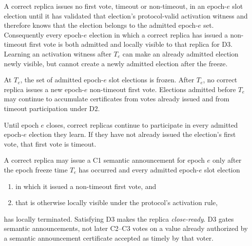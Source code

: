 \documentclass[11pt]{article}
\theoremstyle{definition}
\theoremstyle{remark}
\begin{document}
\begin{description}[leftmargin=2.4em,labelindent=0em]
\item[D0 (admission-gated epoch voting).]
A correct replica issues no first vote, timeout or non-timeout, in an epoch-$e$ slot election until it has validated that election's protocol-valid activation witness and therefore knows that the election belongs to the admitted epoch-$e$ set. Consequently every epoch-$e$ election in which a correct replica has issued a non-timeout first vote is both admitted and locally visible to that replica for D3. Learning an activation witness after $T_e$ can make an already admitted election newly visible, but cannot create a newly admitted election after the freeze.

\item[D1 (freeze and non-timeout-vote fence).]
At $T_e$, the set of admitted epoch-$e$ slot elections is frozen. After $T_e$, no correct replica issues a new epoch-$e$ non-timeout first vote. Elections admitted before $T_e$ may continue to accumulate certificates from votes already issued and from timeout participation under D2.

\item[D2 (continued drain participation).]
Until epoch $e$ closes, correct replicas continue to participate in every admitted epoch-$e$ election they learn. If they have not already issued the election's first vote, that first vote is timeout.

\item[D3 (semantic-announcement readiness).]
A correct replica may issue a C1 semantic announcement for epoch $e$ only after the epoch freeze time $T_e$ has occurred and every admitted epoch-$e$ slot election
\begin{enumerate}[label=(\alph*),nosep]
  \item in which it issued a non-timeout first vote, and
  \item that is otherwise locally visible under the protocol's activation rule,
\end{enumerate}
has locally terminated. Satisfying D3 makes the replica \emph{close-ready}. D3 gates semantic announcements, not later C2--C3 votes on a value already authorized by a semantic announcement certificate accepted as timely by that voter.


\end{description}
\end{document}
